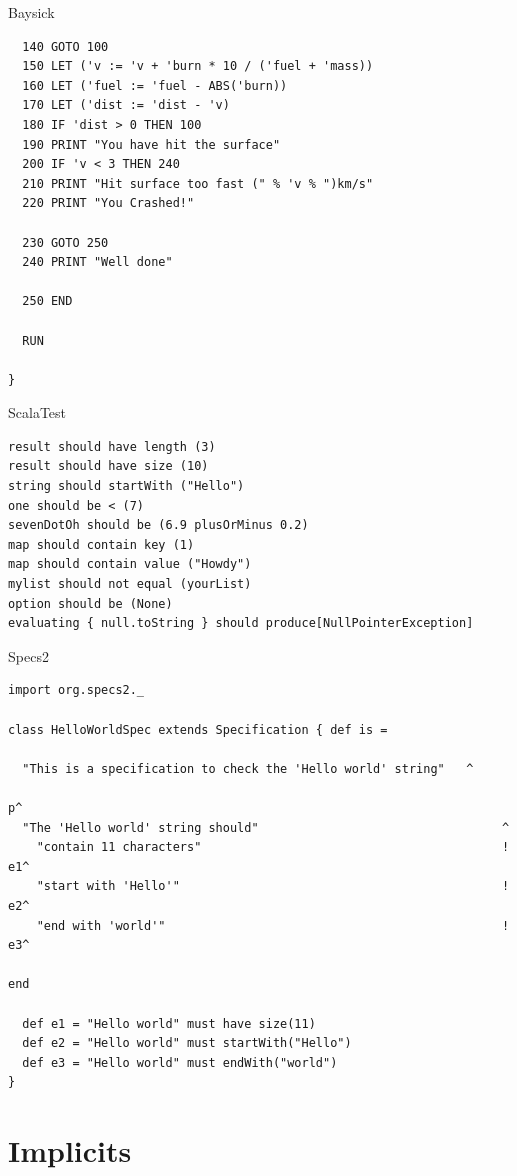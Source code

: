 \begin{frame}[fragile]{Baysick}
\begin{lstlisting}
  140 GOTO 100
  150 LET ('v := 'v + 'burn * 10 / ('fuel + 'mass))
  160 LET ('fuel := 'fuel - ABS('burn))
  170 LET ('dist := 'dist - 'v)
  180 IF 'dist > 0 THEN 100
  190 PRINT "You have hit the surface"
  200 IF 'v < 3 THEN 240
  210 PRINT "Hit surface too fast (" % 'v % ")km/s"
  220 PRINT "You Crashed!"

  230 GOTO 250
  240 PRINT "Well done"

  250 END

  RUN
  
}
\end{lstlisting}
\end{frame}

\begin{frame}[fragile]{ScalaTest}
\begin{lstlisting}
result should have length (3)
result should have size (10)
string should startWith ("Hello")
one should be < (7)
sevenDotOh should be (6.9 plusOrMinus 0.2)
map should contain key (1)
map should contain value ("Howdy")
mylist should not equal (yourList)
option should be (None)
evaluating { null.toString } should produce[NullPointerException]
\end{lstlisting}
\end{frame}

\begin{frame}[fragile]{Specs2}
\begin{lstlisting}
import org.specs2._

class HelloWorldSpec extends Specification { def is =

  "This is a specification to check the 'Hello world' string"	^
                                                               	     p^
  "The 'Hello world' string should"                            	     ^
    "contain 11 characters"                                    	     ! e1^
    "start with 'Hello'"                                       	     ! e2^
    "end with 'world'"                                         	     ! e3^
                                                               	     end

  def e1 = "Hello world" must have size(11)
  def e2 = "Hello world" must startWith("Hello")
  def e3 = "Hello world" must endWith("world")
}
\end{lstlisting}
\end{frame}

\section{Implicits}

